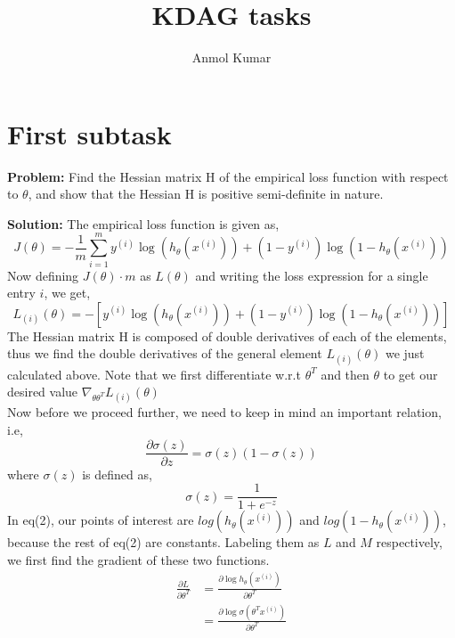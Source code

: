 \documentclass[12pt]{article}
\title{KDAG tasks}
\author{Anmol Kumar}
\begin{document}
\maketitle

\section{First subtask}
\textbf{Problem:} Find the Hessian matrix H of the empirical loss function with respect to $\theta$, and show that the Hessian H is positive semi-definite in nature.

\begin{flushleft}
\textbf{Solution:} The empirical loss function is given as,
\begin{equation}
J(\theta)=-\frac{1}{m}\sum_{i=1}^{m}y^{(i)} \log(h_\theta(x^{(i)}))+(1-y^{(i)})\log(1-h_\theta(x^{(i)}))
\end{equation}
Now defining $J(\theta)\cdot m$ as $L(\theta)$ and writing the loss expression for a single entry $i$, we get,
\begin{equation}
    L_{(i)}(\theta)=-[y^{(i)} \log(h_\theta(x^{(i)}))+(1-y^{(i)})\log(1-h_\theta(x^{(i)}))]
\end{equation}
The Hessian matrix H is composed of double derivatives of each of the elements, thus we find the double derivatives of the general element $L_{(i)}(\theta)$ we just calculated above. Note that we first differentiate w.r.t $\theta^T$ and then $\theta$ to get our desired value $\nabla_{\theta\theta^T}L_{(i)}(\theta)$\\
Now before we proceed further, we need to keep in mind an important relation, i.e,
\begin{equation}
    \frac{\partial\sigma(z)}{\partial z}=\sigma(z)(1-\sigma(z))
\end{equation}
where $\sigma(z)$ is defined as,
\begin{equation}
    \sigma(z)=\frac{1}{1+e^{-z}}
\end{equation}
In eq(2), our points of interest are $log(h_\theta(x^{(i)}))$ and $log(1-h_\theta(x^{(i)}))$, because the rest of eq(2) are constants. Labeling them as $L$ and $M$ respectively, we first find the gradient of these two functions.
\begin{equation}
\begin{aligned}
\frac{\partial L}{\partial \theta^T}
    &=\frac{\partial \log h_\theta(x^{(i)})}{\partial \theta^T}\\
    &=\frac{\partial \log \sigma(\theta^T x^{(i)})}{\partial \theta^T}\\

\end{aligned}
\end{equation}
\end{flushleft}
\end{document}
